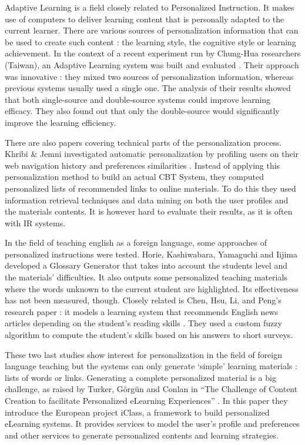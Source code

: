 \documentclass[a4paper,12pt]{article}
\begin{document}
Adaptive Learning is a field closely related to Personalized Instruction. It makes use of computers to deliver learning content that is personally adapted to the current learner. There are various sources of personalization information that can be used to create such content : the learning style, the cognitive style or learning achievement. In the context of a recent experiment run by Chung-Hua researchers (Taiwan), an Adaptive Learning system was built and evaluated \cite{tseng_two_sources}. Their approach was innovative : they mixed two sources of personalization information, whereas previous systems usually used a single one. The analysis of their results showed that both single-source and double-source systems could improve learning efficacy. They also found out that only the double-source would significantly improve the learning efficiency.

There are also papers covering technical parts of the personalization process. Khribi \& Jemni investigated automatic personalization by profiling users on their web navigation history and preferences similarities \cite{khribi_recommendations}. Instead of applying this personalization method to build an actual CBT System, they computed personalized lists of recommended links to online materials. To do this they used information retrieval techniques and data mining on both the user profiles and the materials contents. It is however hard to evaluate their results, as it is often with IR systems.

In the field of teaching english as a foreign language, some approaches of personalized instructions were tested. Horie, Kashiwabara, Yamaguchi and Iijima developed a Glossary Generator \cite{iijima_wordlist_generator} that takes into account the students level and the materials' difficulties. It also outputs some personalized teaching materials where the words unknown to the current student are highlighted. Its effectiveness has not been measured, though. Closely related is Chen, Hsu, Li, and Peng's research paper : it models a learning system that recommends English news articles depending on the student's reading skills \cite{chen_mlearning}. They used a custom fuzzy algorithm to compute the student's skills based on his answers to short surveys.

These two last studies show interest for personalization in the field of foreign language teaching but the systems can only generate `simple' learning materials : lists of words or links. Generating a complete personalized material is a big challenge, as raised by Turker, Görgün and Conlan in ``The Challenge of Content Creation to facilitate Personalized eLearning Experiences'' \cite{turker_challenge_creation}. In this paper they introduce the European project iClass, a framework to build personalized eLearning systems. It provides services to model the user's profile and preferences and other services to generate personalized contents and learning strategies.
\end{document}
